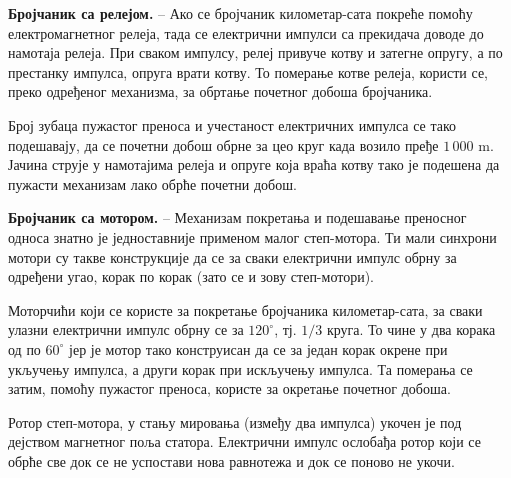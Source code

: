 \documentclass{report}
\begin{document}
\textbf{Бројчаник са релејом.} – Ако се бројчаник километар-сата покреће помоћу електромагнетног релеја, тада се електрични импулси 
са прекидача доводе до намотаја релеја. При сваком импулсу, релеј привуче котву и затегне опругу, а по престанку импулса, 
опруга врати котву. То померање котве релеја, користи се, преко одређеног механизма, за обртање почетног добоша бројчаника.

Број зубаца пужастог преноса и учестаност електричних импулса се тако подешавају, да се почетни добош обрне за цео круг када 
возило пређе $1\,000\text{ m}$. Јачина струје у намотајима релеја и опруге која враћа котву тако је подешена да пужасти механизам лако обрће почетни добош.

\textbf{Бројчаник са мотором.} – Механизам покретања и подешавање преносног односа знатно је једноставније применом малог степ-мотора. 
Ти мали синхрони мотори су такве конструкције да се за сваки електрични импулс обрну за одређени угао, корак по корак 
(зато се и зову степ-мотори).

Моторчићи који се користе за покретање бројчаника километар-сата, за сваки улазни електрични импулс обрну се за $120^\circ$, 
тј. $1/3$ круга. То чине у два корака од по $60^\circ$ јер је мотор тако конструисан да се за један корак окрене при укључењу импулса, 
а други корак при искључењу импулса. Та померања се затим, помоћу пужастог преноса, користе за окретање почетног добоша.

Ротор степ-мотора, у стању мировања (између два импулса) укочен је под дејством магнетног поља статора. 
Електрични импулс ослобађа ротор који се обрће све док се не успостави нова равнотежа и 
док се поново не укочи. 



\end{document}
